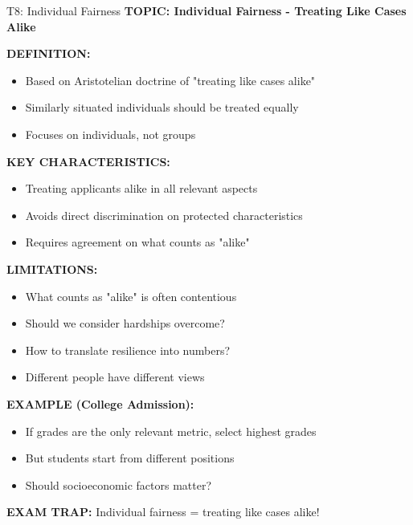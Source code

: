 \documentclass[8pt]{beamer}
\begin{document}
	\begin{frame}{T8: Individual Fairness}
		\fontsize{6.5}{7.5}\selectfont
		\textbf{TOPIC: Individual Fairness - Treating Like Cases Alike}
		
		\vspace{0.1cm}
		\textbf{DEFINITION:}
		\begin{itemize}
			\item Based on Aristotelian doctrine of "treating like cases alike"
			\item Similarly situated individuals should be treated equally
			\item Focuses on individuals, not groups
		\end{itemize}
		
		\vspace{0.1cm}
		\textbf{KEY CHARACTERISTICS:}
		\begin{itemize}
			\item Treating applicants alike in all relevant aspects
			\item Avoids direct discrimination on protected characteristics
			\item Requires agreement on what counts as "alike"
		\end{itemize}
		
		\vspace{0.1cm}
		\textbf{LIMITATIONS:}
		\begin{itemize}
			\item What counts as "alike" is often contentious
			\item Should we consider hardships overcome?
			\item How to translate resilience into numbers?
			\item Different people have different views
		\end{itemize}
		
		\vspace{0.1cm}
		\textbf{EXAMPLE (College Admission):}
		\begin{itemize}
			\item If grades are the only relevant metric, select highest grades
			\item But students start from different positions
			\item Should socioeconomic factors matter?
		\end{itemize}
		
		\textcolor{myred}{\textbf{EXAM TRAP:}} Individual fairness = \textcolor{myblue}{treating like cases alike}!
	\end{frame}
	
\end{document}
